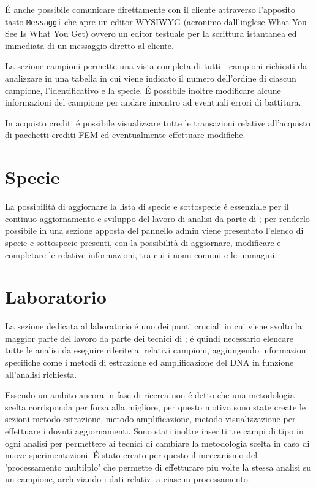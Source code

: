 É anche possibile comunicare direttamente con il cliente attraverso l'apposito tasto \texttt{Messaggi} che apre un editor WYSIWYG (acronimo dall'inglese What You See Is What You Get) ovvero un editor testuale per la scrittura istantanea ed immediata di un messaggio diretto al cliente.

La sezione \textsf{campioni} permette una vista completa di tutti i campioni richiesti da analizzare in una tabella in cui viene indicato il numero dell'ordine di ciascun campione, l'identificativo e la specie. É possibile inoltre modificare alcune informazioni del campione per andare incontro ad eventuali errori di battitura.

In \textsf{acquisto crediti} é possibile visualizzare tutte le transazioni relative all'acquisto di pacchetti crediti FEM ed eventualmente effettuare modifiche.

\section*{Specie}
La possibilità di aggiornare la lista di \textsf{specie} e \textsf{sottospecie} é essenziale per il continuo aggiornamento e sviluppo del lavoro di analisi da parte di {\fem}; per renderlo possibile in una sezione apposta del pannello admin viene presentato l'elenco di specie e sottospecie presenti, con la possibilità di aggiornare, modificare e completare le relative informazioni, tra cui i nomi comuni e le immagini.

\section*{Laboratorio}
La sezione dedicata al laboratorio é uno dei punti cruciali in cui viene svolto la maggior parte del lavoro da parte dei tecnici di {\fem}; é quindi necessario elencare tutte le analisi da eseguire riferite ai relativi campioni, aggiungendo informazioni specifiche come i metodi di estrazione ed amplificazione del DNA in funzione all'analisi richiesta. 

Essendo un ambito ancora in fase di ricerca non é detto che una metodologia scelta corrisponda per forza alla migliore, per questo motivo sono state create le sezioni \textsf{metodo estrazione}, \textsf{metodo amplificazione}, \textsf{metodo visualizzazione} per effettuare i dovuti aggiornamenti. Sono stati inoltre inseriti tre campi di tipo  in ogni analisi per permettere ai tecnici di cambiare la metodologia scelta in caso di nuove sperimentazioni. É stato creato per questo il meccanismo del 'processamento multilplo' che permette di effetturare piu volte la stessa analisi su un campione, archiviando i dati relativi a ciascun processamento.

